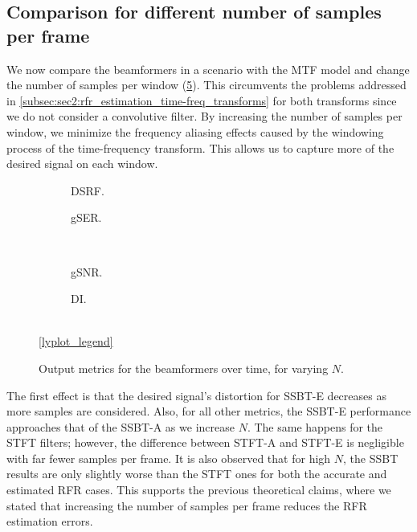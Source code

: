 
\subsection{Comparison for different number of samples per frame}

We now compare the beamformers in a scenario with the MTF model and change the number of samples per window (\cref{fig:lineplot__N_var__iSER_n15__Ly_1}). This circumvents the problems addressed in \cref{subsec:sec2:rfr_estimation_time-freq_transforms} for both transforms since we do not consider a convolutive filter. By increasing the number of samples per window, we minimize the frequency aliasing effects caused by the windowing process of the time-frequency transform. This allows us to capture more of the desired signal on each window.
\begin{figure}[!t]
	\centering
	\begin{subfigure}{0.49\textwidth}
		\centering
		
		\caption{DSRF.}
		\label{subfig:lineplot__DSRF__N_var__iSER_n15__Ly_1}
	\end{subfigure}\hfill
	\begin{subfigure}{0.49\textwidth}
		\centering
		
		\caption{gSER.}
		\label{subfig:lineplot__gSER__N_var__iSER_n15__Ly_1}
	\end{subfigure}\\[1em]
	\begin{subfigure}{0.49\textwidth}
		\centering
		
		\caption{gSNR.}
		\label{subfig:lineplot__gSNR__N_var__iSER_n15__Ly_1}
	\end{subfigure}\hfill
	\begin{subfigure}{0.49\textwidth}
		\centering
		
		\caption{DI.}
		\label{subfig:lineplot__DI__N_var__iSER_n15__Ly_1}
	\end{subfigure}\\[1em]
	\ref*{lyplot_legend}
	\caption{Output metrics for the beamformers over time, for varying $N$.}
	\label{fig:lineplot__N_var__iSER_n15__Ly_1}
\end{figure}

The first effect is that the desired signal's distortion for SSBT-E decreases as more samples are considered. Also, for all other metrics, the SSBT-E performance approaches that of the SSBT-A as we increase $N$. The same happens for the STFT filters; however, the difference between STFT-A and STFT-E is negligible with far fewer samples per frame. It is also observed that for high $N$, the SSBT results are only slightly worse than the STFT ones for both the accurate and estimated RFR cases. This supports the previous theoretical claims, where we stated that increasing the number of samples per frame reduces the RFR estimation errors.

